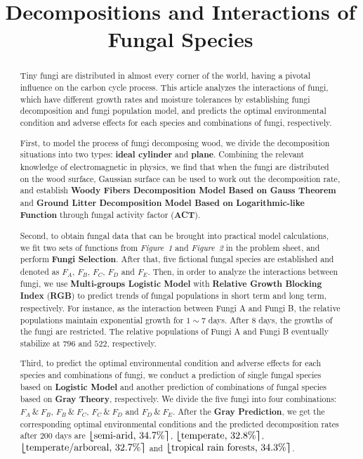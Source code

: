 \documentclass{mcmthesis}
\title{\LARGE\textbf{Decompositions and Interactions of Fungal Species}} %
\begin{document}
\begin{abstract}
  \par
  Tiny fungi are distributed in almost every corner of the world, having a pivotal influence on the carbon cycle process. This article analyzes the interactions of fungi, which have different growth rates and moisture tolerances by establishing fungi decomposition and fungi population model, and predicts the optimal environmental condition and adverse effects for each species and combinations of fungi, respectively.
  \par
  First, to model the process of fungi decomposing wood, we divide the decomposition situations into two types: \textbf{ideal cylinder} and \textbf{plane}. Combining the relevant knowledge of electromagnetic in physics, we find that when the fungi are distributed on the wood surface, Gaussian surface can be used to work out the decomposition rate, and establish \textbf{Woody Fibers Decomposition Model Based on Gauss Theorem} and \textbf{Ground Litter Decomposition Model Based on Logarithmic-like Function} through fungal activity factor (\textbf{ACT}).
  \par
  Second, to obtain fungal data that can be brought into practical model calculations, we fit two sets of functions from \textit{Figure~1} and \textit{Figure~2} in the problem sheet, and perform \textbf{Fungi Selection}. After that, five fictional fungal species are established and denoted as $F_A$, $F_B$, $F_C$, $F_D$ and $F_E$. Then, in order to analyze the interactions between fungi, we use \textbf{Multi-groups Logistic Model} with \textbf{Relative Growth Blocking Index} (\textbf{RGB}) to predict trends of fungal populations in short term and long term, respectively. For instance, as the interaction between Fungi A and Fungi B, the relative populations maintain exponential growth for $1\sim 7$ days. After 8 days, the growths of the fungi are restricted. The relative populations of Fungi A and Fungi B eventually stabilize at $796$ and $522$, respectively.
  \par
  Third, to predict the optimal environmental condition and adverse effects for each species and combinations of fungi, we conduct a prediction of single fungal species based on \textbf{Logistic Model} and another prediction of combinations of fungal species based on \textbf{Gray Theory}, respectively. We divide the five fungi into four combinations: $F_A\ \&\ F_B$, $F_B\ \&\ F_C$, $F_C\ \&\ F_D$ and $F_D\ \&\ F_E$. After the \textbf{Gray Prediction}, we get the corresponding optimal environmental conditions and the predicted decomposition rates after $200$ days are $\bm{\left\lfloor} \text{semi-arid, }34.7\% \bm{\right\rceil}$, $\bm{\left\lfloor} \text{temperate, }32.8\% \bm{\right\rceil}$, $\bm{\left\lfloor} \text{temperate/arboreal, }32.7\%\bm{\right \rceil}$ and $\bm{\left\lfloor} \text{tropical rain forests, }34.3\% \bm{\right\rceil}$.

\end{abstract}
\end{document}
